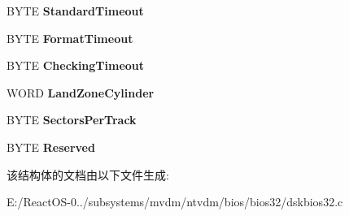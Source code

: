 \begin{DoxyCompactItemize}
B\+Y\+TE {\bfseries Standard\+Timeout}
\item 
\mbox{\label{struct___h_a_r_d_d_i_s_k___p_a_r_a_m___t_a_b_l_e_abf0d4fdca739e171fbc69f9ef648f616}} 
B\+Y\+TE {\bfseries Format\+Timeout}
\item 
\mbox{\label{struct___h_a_r_d_d_i_s_k___p_a_r_a_m___t_a_b_l_e_aad2e898716a553248280fbb30de5a787}} 
B\+Y\+TE {\bfseries Checking\+Timeout}
\item 
\mbox{\label{struct___h_a_r_d_d_i_s_k___p_a_r_a_m___t_a_b_l_e_ada11803e8e0a52927d9dbf326b3d1bf6}} 
W\+O\+RD {\bfseries Land\+Zone\+Cylinder}
\item 
\mbox{\label{struct___h_a_r_d_d_i_s_k___p_a_r_a_m___t_a_b_l_e_a10ef6370e93a1a8848b0d84e693a4285}} 
B\+Y\+TE {\bfseries Sectors\+Per\+Track}
\item 
\mbox{\label{struct___h_a_r_d_d_i_s_k___p_a_r_a_m___t_a_b_l_e_afe2792a141dc128b03b5c97143d70de8}} 
B\+Y\+TE {\bfseries Reserved}
\end{DoxyCompactItemize}


该结构体的文档由以下文件生成\+:\begin{DoxyCompactItemize}
\item 
E\+:/\+React\+O\+S-\/0../subsystems/mvdm/ntvdm/bios/bios32/dskbios32.\+c\end{DoxyCompactItemize}
